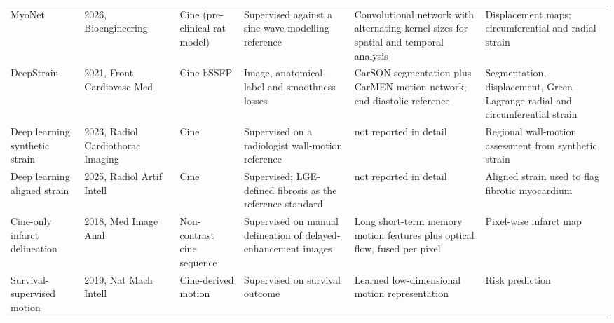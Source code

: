 \begin{longtable}{@{}L{0.135\textwidth}L{0.115\textwidth}L{0.135\textwidth}L{0.155\textwidth}L{0.215\textwidth}L{0.155\textwidth}@{}}
MyoNet & 2026, Bioengineering~\citep{an2026myonet} & Cine (pre-clinical rat model) & Supervised against a sine-wave-modelling reference & Convolutional network with alternating kernel sizes for spatial and temporal analysis & Displacement maps; circumferential and radial strain\\
DeepStrain & 2021, Front Cardiovasc Med~\citep{morales2021} & Cine bSSFP & Image, anatomical-label and smoothness losses & CarSON segmentation plus CarMEN motion network; end-diastolic reference & Segmentation, displacement, Green--Lagrange radial and circumferential strain\\
Deep learning synthetic strain & 2023, Radiol Cardiothorac Imaging~\citep{masutani2023dlss} & Cine & Supervised on a radiologist wall-motion reference & not reported in detail & Regional wall-motion assessment from synthetic strain\\
Deep learning aligned strain & 2025, Radiol Artif Intell~\citep{koehler2025alignedstrain} & Cine & Supervised; LGE-defined fibrosis as the reference standard & not reported in detail & Aligned strain used to flag fibrotic myocardium\\
Cine-only infarct delineation & 2018, Med Image Anal~\citep{xu2018} & Non-contrast cine sequence & Supervised on manual delineation of delayed-enhancement images & Long short-term memory motion features plus optical flow, fused per pixel & Pixel-wise infarct map\\
Survival-supervised motion & 2019, Nat Mach Intell~\citep{bello2019} & Cine-derived motion & Supervised on survival outcome & Learned low-dimensional motion representation & Risk prediction\\
\bottomrule
\end{longtable}

